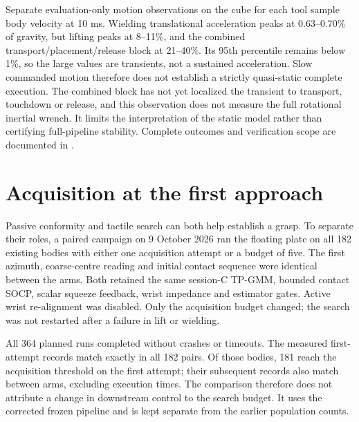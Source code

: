 Separate evaluation-only motion observations on the cube for each tool sample body velocity at 10 ms. Wielding translational acceleration peaks at 0.63--0.70\% of gravity, but lifting peaks at 8--11\%, and the combined transport/placement/release block at 21--40\%. Its 95th percentile remains below 1\%, so the large values are transients, not a sustained acceleration. Slow commanded motion therefore does not establish a strictly quasi-static complete execution. The combined block has not yet localized the transient to transport, touchdown or release, and this observation does not measure the full rotational inertial wrench. It limits the interpretation of the static model rather than certifying full-pipeline stability. Complete outcomes and verification scope are documented in .

\section{Acquisition at the first approach}
\label{sec:plate-search}

Passive conformity and tactile search can both help establish a grasp. To separate their roles, a paired campaign on 9 October 2026 ran the floating plate on all 182 existing bodies with either one acquisition attempt or a budget of five. The first azimuth, coarse-centre reading and initial contact sequence were identical between the arms. Both retained the same session-C TP-GMM, bounded contact SOCP, scalar squeeze feedback, wrist impedance and estimator gates. Active wrist re-alignment was disabled. Only the acquisition budget changed; the search was not restarted after a failure in lift or wielding.

All 364 planned runs completed without crashes or timeouts. The measured first-attempt records match exactly in all 182 pairs. Of those bodies, 181 reach the acquisition threshold on the first attempt; their subsequent records also match between arms, excluding execution times. The comparison therefore does not attribute a change in downstream control to the search budget. It uses the corrected frozen pipeline and is kept separate from the earlier population counts.

